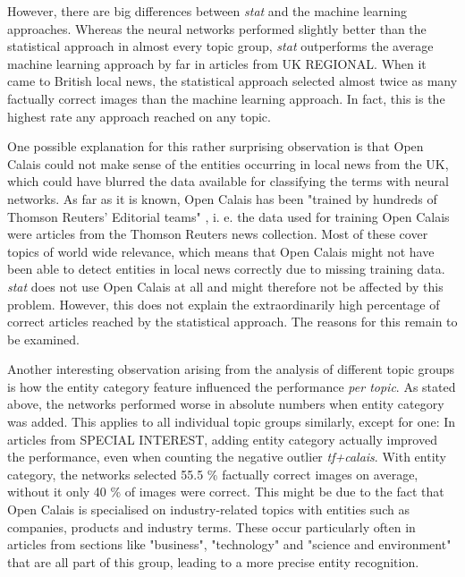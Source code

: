 \documentclass[11pt,a4paper,twoside]{article}
\begin{document}
However, there are big differences between \emph{stat} and the machine learning approaches. Whereas the neural networks performed slightly better than the statistical approach in almost every topic group, \emph{stat} outperforms the average machine learning approach by far in articles from UK REGIONAL. When it came to British local news, the statistical approach selected almost twice as many factually correct images than the machine learning approach. In fact, this is the highest rate any approach reached on any topic.

One possible explanation for this rather surprising observation is that Open Calais could not make sense of the entities occurring in local news from the UK, which could have blurred the data available for classifying the terms with neural networks. As far as it is known, Open Calais has been "trained by hundreds of Thomson Reuters' Editorial teams" \cite{ThomsonReutersAboutCalais}, i. e. the data used for training Open Calais were articles from the Thomson Reuters news collection. Most of these cover topics of world wide relevance, which means that Open Calais might not have been able to detect entities in local news correctly due to missing training data. \emph{stat} does not use Open Calais at all and might therefore not be affected by this problem. However, this does not explain the extraordinarily high percentage of correct articles reached by the statistical approach. The reasons for this remain to be examined.

\bigskip

Another interesting observation arising from the analysis of different topic groups is how the entity category feature influenced the performance \emph{per topic}. As stated above, the networks performed worse in absolute numbers when entity category was added. This applies to all individual topic groups similarly, except for one: In articles from SPECIAL INTEREST, adding entity category actually improved the performance, even when counting the negative outlier \emph{tf+calais}. With entity category, the networks selected 55.5 \% factually correct images on average, without it only 40 \% of images were correct. This might be due to the fact that Open Calais is specialised on industry-related topics with entities such as companies, products and industry terms. These occur particularly often in articles from sections like "business", "technology" and "science and environment" that are all part of this group, leading to a more precise entity recognition.

\end{document}
